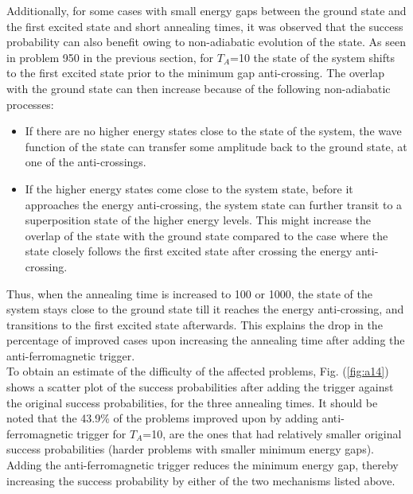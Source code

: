 \documentclass[../main.tex]{subfiles}
\begin{document}
Additionally, for some cases with small energy gaps between the ground state and the first excited state and short annealing times, it was observed that the success probability can also benefit owing to non-adiabatic evolution of the state. As seen in problem 950 in the previous section, for $T_A$=10 the state of the system shifts to the first excited state prior to the minimum gap anti-crossing. The overlap with the ground state can then increase because of the following non-adiabatic processes:
\begin{itemize}
\item If there are no higher energy states close to the state of the system, the wave function of the state can transfer some amplitude back to the ground state, at one of the anti-crossings.
\item If the higher energy states come close to the system state, before it approaches the energy anti-crossing, the system state can further transit to a superposition state of the higher energy levels. This might increase the overlap of the state with the ground state compared to the case where the state closely follows the first excited state after crossing the energy anti-crossing.
\end{itemize}

Thus, when the annealing time is increased to 100 or 1000, the state of the system stays close to the ground state till it reaches the energy anti-crossing, and transitions to the first excited state afterwards. This explains the drop in the percentage of improved cases upon increasing the annealing time after adding the anti-ferromagnetic trigger. \\

To obtain an estimate of the difficulty of the affected problems, Fig. (\ref{fig:a14}) shows a scatter plot of the success probabilities after adding the trigger against the original success probabilities, for the three annealing times. It should be noted that the 43.9\% of the problems improved upon by adding anti-ferromagnetic trigger for $T_A$=10, are the ones that had relatively smaller original success probabilities (harder problems with smaller minimum energy gaps). Adding the anti-ferromagnetic trigger reduces the minimum energy gap, thereby increasing the success probability by either of the two mechanisms listed above.
\end{document}
